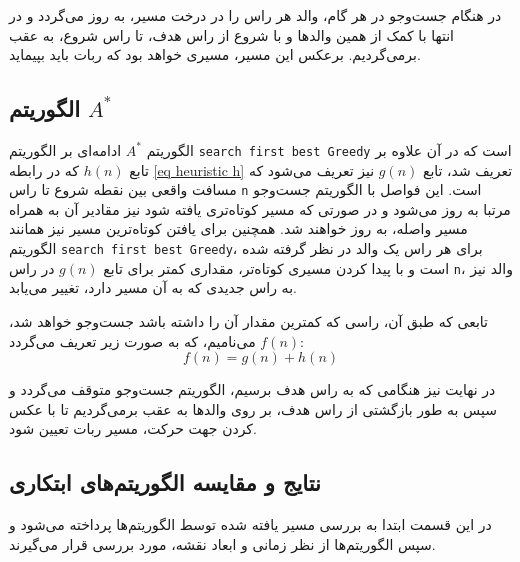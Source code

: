 در هنگام جست‌وجو در هر گام، والد هر راس را در درخت مسیر، به روز می‌گردد و در انتها با کمک از همین والد‌ها و با شروع از راس هدف، تا راس شروع، به عقب برمی‌گردیم. برعکس این مسیر، مسیری خواهد بود که ربات باید بپیماید.

\subsection{الگوریتم $A^*$}
الگوریتم $A^*$ ادامه‌ای بر الگوریتم \verb|search first best Greedy| است که در آن علاوه بر تابع $h(n)$ که در رابطه \ref{eq heuristic h} تعریف شد، تابع $g(n)$ نیز تعریف می‌شود که مسافت واقعی بین نقطه شروع تا راس \verb|n| است. این فواصل با الگوریتم جست‌وجو مرتبا به روز می‌شود و در صورتی که مسیر کوتاه‌تری یافته شود نیز مقادیر آن به همراه مسیر واصله، به روز خواهند شد. همچنین برای یافتن کوتاه‌ترین مسیر نیز همانند الگوریتم \verb|search first best Greedy|، برای هر راس یک والد در نظر گرفته شده است و با پیدا کردن مسیری کوتاه‌تر، مقداری کمتر برای تابع $g(n)$ در راس \verb|n|، والد نیز به راس جدیدی که به آن مسیر دارد، تغییر می‌یابد.

تابعی که طبق آن، راسی که کمترین مقدار آن را داشته باشد جست‌وجو خواهد شد، $f(n)$ می‌نامیم، که به صورت زیر تعریف می‌گردد:
\begin{equation}%
	f(n) = g(n) + h(n)
\end{equation}

در نهایت نیز هنگامی که به راس هدف برسیم، الگوریتم جست‌وجو متوقف می‌گردد و سپس به طور بازگشتی از راس هدف، بر روی والدها به عقب برمی‌گردیم تا با عکس کردن جهت حرکت، مسیر ربات تعیین شود. 


\subsection{نتایج و مقایسه الگوریتم‌های ابتکاری}\label{sec heuristic result}
در این قسمت ابتدا به بررسی مسیر یافته شده توسط الگوریتم‌ها پرداخته می‌شود و سپس الگوریتم‌ها از نظر زمانی و ابعاد نقشه، مورد بررسی قرار می‌گیرند.

